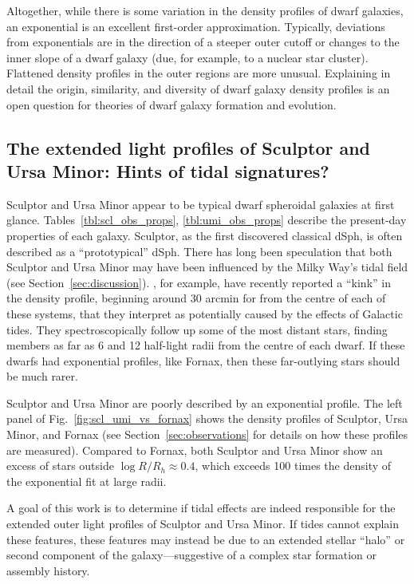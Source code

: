 Altogether, while there is some variation in the density profiles of
dwarf galaxies, an exponential is an excellent first-order
approximation. Typically, deviations from exponentials are in the
direction of a steeper outer cutoff or changes to the inner slope of a
dwarf galaxy (due, for example, to a nuclear star cluster). Flattened
density profiles in the outer regions are more unusual. Explaining in
detail the origin, similarity, and diversity of dwarf galaxy density
profiles is an open question for theories of dwarf galaxy formation and
evolution.

\subsection{The extended light profiles of Sculptor and Ursa Minor:
Hints of tidal
signatures?}\label{the-extended-light-profiles-of-sculptor-and-ursa-minor-hints-of-tidal-signatures}

Sculptor and Ursa Minor appear to be typical dwarf spheroidal galaxies
at first glance. Tables~\ref{tbl:scl_obs_props}, \ref{tbl:umi_obs_props}
describe the present-day properties of each galaxy. Sculptor, as the
first discovered classical dSph, is often described as a
``prototypical'' dSph. There has long been speculation that both
Sculptor and Ursa Minor may have been influenced by the Milky Way's
tidal field (see Section~\ref{sec:discussion}).
\citet{sestito+2023a, sestito+2023b}, for example, have recently
reported a ``kink'' in the density profile, beginning around 30 arcmin
for from the centre of each of these systems, that they interpret as
potentially caused by the effects of Galactic tides. They
spectroscopically follow up some of the most distant stars, finding
members as far as 6 and 12 half-light radii from the centre of each
dwarf. If these dwarfs had exponential profiles, like Fornax, then these
far-outlying stars should be much rarer.

Sculptor and Ursa Minor are poorly described by an exponential profile.
The left panel of Fig.~\ref{fig:scl_umi_vs_fornax} shows the density
profiles of Sculptor, Ursa Minor, and Fornax (see
Section~\ref{sec:observations} for details on how these profiles are
measured). Compared to Fornax, both Sculptor and Ursa Minor show an
excess of stars outside \(\log R/R_h\approx 0.4\), which exceeds 100
times the density of the exponential fit at large radii.

A goal of this work is to determine if tidal effects are indeed
responsible for the extended outer light profiles of Sculptor and Ursa
Minor. If tides cannot explain these features, these features may
instead be due to an extended stellar ``halo'' or second component of
the galaxy---suggestive of a complex star formation or assembly history.

